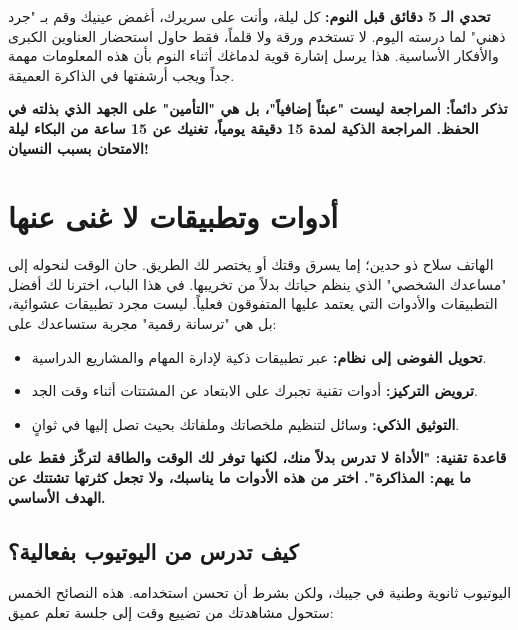 \documentclass[12pt,a4paper]{book}
\newcommand{\importantAr}[1]{%
	\begin{important}
		\bfseries #1
	\end{important}
}
\begin{document}
	\begin{exercise}
		\textbf{تحدي الـ 5 دقائق قبل النوم:}
		كل ليلة، وأنت على سريرك، أغمض عينيك وقم بـ "جرد ذهني" لما درسته اليوم. لا تستخدم ورقة ولا قلماً، فقط حاول استحضار العناوين الكبرى والأفكار الأساسية. هذا يرسل إشارة قوية لدماغك أثناء النوم بأن هذه المعلومات مهمة جداً ويجب أرشفتها في الذاكرة العميقة.
	\end{exercise}
	
	\importantAr{تذكر دائماً: المراجعة ليست "عبئاً إضافياً"، بل هي "التأمين" على الجهد الذي بذلته في الحفظ. المراجعة الذكية لمدة 15 دقيقة يومياً، تغنيك عن 15 ساعة من البكاء ليلة الامتحان بسبب النسيان!}
	
	

\chapter{أدوات وتطبيقات لا غنى عنها}
\label{sec:owner-experiences9}
\label{chap:apps}

الهاتف سلاح ذو حدين؛ إما يسرق وقتك أو يختصر لك الطريق. حان الوقت لنحوله إلى "مساعدك الشخصي" الذي ينظم حياتك بدلاً من تخريبها. في هذا الباب، اخترنا لك أفضل التطبيقات والأدوات التي يعتمد عليها المتفوقون فعلياً. ليست مجرد تطبيقات عشوائية، بل هي "ترسانة رقمية" مجربة ستساعدك على:

\begin{itemize}
	\item \textbf{تحويل الفوضى إلى نظام:} عبر تطبيقات ذكية لإدارة المهام والمشاريع الدراسية.
	\item \textbf{ترويض التركيز:} أدوات تقنية تجبرك على الابتعاد عن المشتتات أثناء وقت الجد.
	\item \textbf{التوثيق الذكي:} وسائل لتنظيم ملخصاتك وملفاتك بحيث تصل إليها في ثوانٍ.
\end{itemize}

\importantAr{قاعدة تقنية: "الأداة لا تدرس بدلاً منك، لكنها توفر لك الوقت والطاقة لتركّز فقط على ما يهم: المذاكرة". اختر من هذه الأدوات ما يناسبك، ولا تجعل كثرتها تشتتك عن الهدف الأساسي.}

\section{كيف تدرس من اليوتيوب بفعالية؟}
\label{sec:youtube-study-tips}

اليوتيوب ثانوية وطنية في جيبك، ولكن بشرط أن تحسن استخدامه. هذه النصائح الخمس ستحول مشاهدتك من تضييع وقت إلى جلسة تعلم عميق:
\end{document}
